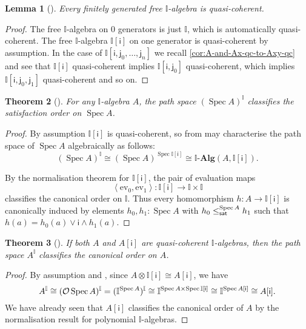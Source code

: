 \documentclass[a4paper,12pt]{amsart}
\newtheorem{theorem}{Theorem}[section]
\newtheorem{lemma}[theorem]{Lemma}
\theoremstyle{definition}
\newcommand{\mb}[1]{\mathbf{#1}}
\newcommand{\mbb}[1]{\mathbb{#1}}
\newcommand{\I}{\mbb I}
\newcommand{\ms}[1]{\mathsf{#1}}
\newcommand{\alg}{\text{-}\mb{Alg}}
\newcommand{\pair}[1]{\left\langle#1\right\rangle}
\newcommand{\ev}{\mathrm{ev}}
\newcommand{\spec}{\operatorname{Spec}}
\begin{document}

\begin{lemma}[\AxiomSQCP]\label{lem:fg-qc}
  Every finitely generated free $\I$-algebra is quasi-coherent.
\end{lemma}

\begin{proof}
  The free $\I$-algebra on $0$ generators is just $\I$, which is automatically quasi-coherent. The free $\I$-algebra $\I[\ms{i}]$ on one generator is quasi-coherent by assumption. In the case of $\I[\ms{i},\ms{j}_0,\ldots,\ms{j}_n]$ we recall \cref{cor:A-and-Ax-qc-to-Axy-qc} and see that $\I[\ms{i}]$ quasi-coherent implies $\I[\ms{i},\ms{j}_0]$ quasi-coherent, which implies $\I[\ms{i},\ms{j}_0,\ms{j}_1]$ quasi-coherent and so on.
\end{proof}


\begin{theorem}[\AxiomSQCP]\label{thm:phoa-spectrum}
  For any $\I$-algebra $A$, the path space ${(\spec A)}^\I$ classifies the satisfaction order on $\spec A$.
\end{theorem}
\begin{proof}
  By assumption $\I[\ms{i}]$ is quasi-coherent, so from  may characterise the path space of $\spec{A}$ algebraically as follows:
  \[ (\spec A)^\I \cong (\spec{A})^{\spec{\I[\ms{i}]}}\cong \I\alg(A,\I[\ms{i}])\text{.} \]
  
  By the normalisation theorem for $\I[\ms{i}]$, the pair of evaluation maps
  \[ \pair{\ev_0,\ev_1} \colon \I[\ms{i}] \to \I \times \I \]
  classifies the canonical order on $\I$.
  Thus every homomorphism $h\colon A\to \I[\ms{i}]$ is canonically induced by elements $h_0,h_1:\spec{A}$ with $h_0\satle[\spec{A}] h_1$ such that $h(a) = h_0(a) \vee \ms{i} \wedge h_1(a)$.
\end{proof}


\begin{theorem}[\AxiomSQCP]\label{thm:algebraphoa}
  If both $A$ and $A[\ms{i}]$ are quasi-coherent $\I$-algebras, then the path space $A^\I$ classifies the canonical order on $A$.
\end{theorem}
\begin{proof}
  By assumption and , since $A \otimes \I[\ms{i}] \cong A[\ms{i}]$, we have
  \[ A^\I \cong (\opens\spec A)^\I = (\I^{\spec A})^\I \cong \I^{\spec A \times \spec\I[\ms{i}]} \cong \I^{\spec A[\ms{i}]} \cong A[\ms{i}]\text{.} \]
  We have already seen that $A[\ms{i}]$ classifies the canonical order of $A$ by the normalisation result for polynomial $\I$-algebras.
\end{proof}
\end{document}
